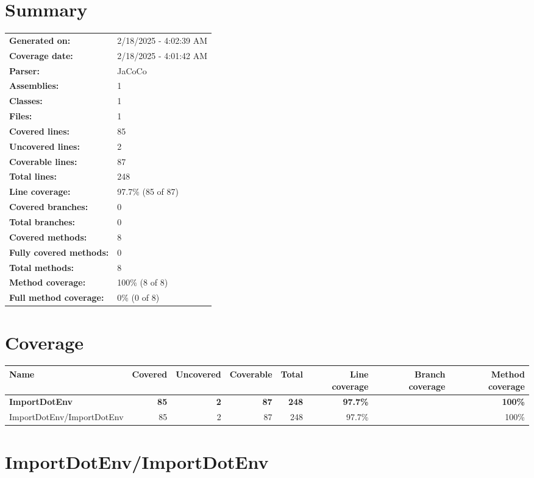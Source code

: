 \documentclass[a4paper,landscape,10pt]{article}
\begin{document}
\setcounter{secnumdepth}{-1}
\section{Summary}
\begin{longtable}[l]{ll}
\textbf{Generated on:} & 2/18/2025 - 4:02:39 AM\\
\textbf{Coverage date:} & 2/18/2025 - 4:01:42 AM\\
\textbf{Parser:} & JaCoCo\\
\textbf{Assemblies:} & 1\\
\textbf{Classes:} & 1\\
\textbf{Files:} & 1\\
\textbf{Covered lines:} & 85\\
\textbf{Uncovered lines:} & 2\\
\textbf{Coverable lines:} & 87\\
\textbf{Total lines:} & 248\\
\textbf{Line coverage:} & 97.7\% (85 of 87)\\
\textbf{Covered branches:} & 0\\
\textbf{Total branches:} & 0\\
\textbf{Covered methods:} & 8\\
\textbf{Fully covered methods:} & 0\\
\textbf{Total methods:} & 8\\
\textbf{Method coverage:} & 100\% (8 of 8)\\
\textbf{Full method coverage:} & 0\% (0 of 8)\\
\end{longtable}
\section{Coverage}
\begin{longtable}[l]{|l|r|r|r|r|r|r|r|}
\hline
\textbf{Name} & \textbf{Covered} & \textbf{Uncovered} & \textbf{Coverable} & \textbf{Total} & \textbf{Line coverage} & \textbf{Branch coverage} & \textbf{Method coverage}\\
\hline
\textbf{ImportDotEnv} & \textbf{85} & \textbf{2} & \textbf{87} & \textbf{248} & \textbf{97.7\%} & \textbf{} & \textbf{100\%}\\
\hline
ImportDotEnv/ImportDotEnv & 85 & 2 & 87 & 248 & 97.7\% &  & 100\%\\
\hline
\end{longtable}
\newpage
\section{ImportDotEnv/ImportDotEnv}
\end{document}
